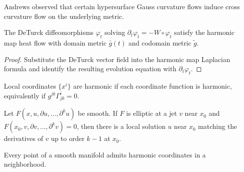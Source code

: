 \begin{remark}
\label{ch03-rem-andrews-observation}
Andrews observed that certain hypersurface Gauss curvature flows induce cross curvature flow on the underlying metric.
\end{remark}

\begin{lemma}
\label{ch03-lem-deTurck-diffeomorphisms-harmonic-map}
The DeTurck diffeomorphisms \(\varphi_t\) solving \(\partial_t\varphi_t=-W\circ\varphi_t\) satisfy the harmonic map heat flow with domain metric \(\bar g(t)\) and codomain metric \(\tilde g\).
\end{lemma}

\begin{proof}
Substitute the DeTurck vector field into the harmonic map Laplacian formula and identify the resulting evolution equation with \(\partial_t\varphi_t\).
\end{proof}

\begin{definition}
\label{ch03-def-harmonic-coordinates}
Local coordinates \(\{x^i\}\) are harmonic if each coordinate function is harmonic, equivalently if \(g^{jk}\Gamma^i_{jk}=0\).
\end{definition}

\begin{theorem}
\label{ch03-thm-local-elliptic-solvability}
Let \(F(x,u,\partial u,\ldots,\partial^ku)\) be smooth. If \(F\) is elliptic at a jet \(v\) near \(x_0\) and \(F(x_0,v,\partial v,\ldots,\partial^kv)=0\), then there is a local solution \(u\) near \(x_0\) matching the derivatives of \(v\) up to order \(k-1\) at \(x_0\).
\end{theorem}

\begin{corollary}
\label{ch03-cor-harmonic-coordinates-exist}
Every point of a smooth manifold admits harmonic coordinates in a neighborhood.
\end{corollary}


